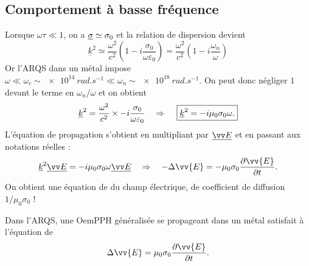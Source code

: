 \documentclass[12pt,fancy]{cours}
\begin{document}
\subsection{Comportement à basse fréquence}

Lorsque $\omega\tau\ll 1$, on a $\underline{\sigma} \simeq \sigma_0$ et la relation de dispersion devient
\begin{equation}
 \underline{k}^2 \simeq \frac{\omega^2}{c^2}\left(1-i\frac{\sigma_0}{\omega\varepsilon_0}\right) = \frac{\omega^2}{c^2}\left(1-i\frac{\omega_n}{\omega}\right)
 \end{equation}
Or l'ARQS dans un métal impose $\omega \ll \omega_c \sim \SI{e14}{rad.s^{-1}} \ll \omega_n \sim \SI{e18}{rad.s^{-1}}$. On peut donc négliger $1$ devant le terme en $\omega_n/\omega$ et on obtient
\begin{equation}\label{eq:k2}
\underline{k}^2=\frac{\omega^2}{c^2}\times -i\frac{\sigma_0}{\omega\varepsilon_0} \quad \Rightarrow \quad\, \boxed{\underline{k}^2= -i\mu_0\sigma_0\omega.}
\end{equation}
L’équation de propagation s'obtient en multipliant par $\udl{\E}$ et en passant aux notations réelles :
\begin{equation}
  \underline{k}^2 \udl{\E} =-i\mu_0\sigma_0 \omega \udl{\E} \Rar 
  -\Delta\vv{E}=-\mu_0\sigma_0\frac{\partial\vv{E}}{\partial t}.
\end{equation}
 On obtient une équation de  du champ électrique, de coefficient de diffusion $1/\mu_0\sigma_0$ !
\begin{theorem}\label{form:}
  Dans l’ARQS, une OemPPH généralisée se propageant dans un métal satisfait à l’équation de 
  \begin{equation*}
    \Delta\vv{E}=\mu_0\sigma_0\frac{\partial\vv{E}}{\partial t}.
  \end{equation*}
\end{theorem}
\end{document}
